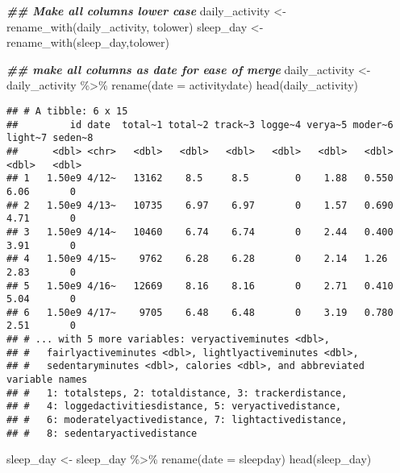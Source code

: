 \documentclass[
]{article}
\newenvironment{Shaded}{\begin{snugshade}}{\end{snugshade}}
\newcommand{\AttributeTok}[1]{\textcolor[rgb]{0.77,0.63,0.00}{#1}}
\newcommand{\DocumentationTok}[1]{\textcolor[rgb]{0.56,0.35,0.01}{\textbf{\textit{#1}}}}
\newcommand{\FunctionTok}[1]{\textcolor[rgb]{0.00,0.00,0.00}{#1}}
\newcommand{\NormalTok}[1]{#1}
\newcommand{\OtherTok}[1]{\textcolor[rgb]{0.56,0.35,0.01}{#1}}
\newcommand{\SpecialCharTok}[1]{\textcolor[rgb]{0.00,0.00,0.00}{#1}}
\begin{document}
\begin{Shaded}
\begin{Highlighting}[]
\DocumentationTok{\#\# Make all columns lower case}
\NormalTok{daily\_activity }\OtherTok{\textless{}{-}} \FunctionTok{rename\_with}\NormalTok{(daily\_activity, tolower)}
\NormalTok{sleep\_day }\OtherTok{\textless{}{-}} \FunctionTok{rename\_with}\NormalTok{(sleep\_day,tolower)}

\DocumentationTok{\#\# make all columns as date for ease of merge}
\NormalTok{daily\_activity }\OtherTok{\textless{}{-}}\NormalTok{ daily\_activity }\SpecialCharTok{\%\textgreater{}\%}
  \FunctionTok{rename}\NormalTok{(}\AttributeTok{date =}\NormalTok{ activitydate)}
\FunctionTok{head}\NormalTok{(daily\_activity)}
\end{Highlighting}
\end{Shaded}

\begin{verbatim}
## # A tibble: 6 x 15
##         id date  total~1 total~2 track~3 logge~4 verya~5 moder~6 light~7 seden~8
##      <dbl> <chr>   <dbl>   <dbl>   <dbl>   <dbl>   <dbl>   <dbl>   <dbl>   <dbl>
## 1   1.50e9 4/12~   13162    8.5     8.5        0    1.88   0.550    6.06       0
## 2   1.50e9 4/13~   10735    6.97    6.97       0    1.57   0.690    4.71       0
## 3   1.50e9 4/14~   10460    6.74    6.74       0    2.44   0.400    3.91       0
## 4   1.50e9 4/15~    9762    6.28    6.28       0    2.14   1.26     2.83       0
## 5   1.50e9 4/16~   12669    8.16    8.16       0    2.71   0.410    5.04       0
## 6   1.50e9 4/17~    9705    6.48    6.48       0    3.19   0.780    2.51       0
## # ... with 5 more variables: veryactiveminutes <dbl>,
## #   fairlyactiveminutes <dbl>, lightlyactiveminutes <dbl>,
## #   sedentaryminutes <dbl>, calories <dbl>, and abbreviated variable names
## #   1: totalsteps, 2: totaldistance, 3: trackerdistance,
## #   4: loggedactivitiesdistance, 5: veryactivedistance,
## #   6: moderatelyactivedistance, 7: lightactivedistance,
## #   8: sedentaryactivedistance
\end{verbatim}

\begin{Shaded}
\begin{Highlighting}[]
\NormalTok{sleep\_day }\OtherTok{\textless{}{-}}\NormalTok{ sleep\_day }\SpecialCharTok{\%\textgreater{}\%}
  \FunctionTok{rename}\NormalTok{(}\AttributeTok{date =}\NormalTok{ sleepday)}
\FunctionTok{head}\NormalTok{(sleep\_day)}
\end{Highlighting}
\end{Shaded}
\end{document}
